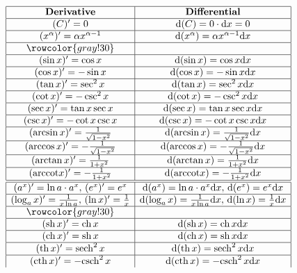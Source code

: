 \documentclass[11pt]{../../TexTemplate/elegantbook}
\begin{document}
\[
\begin{array}{|c|c|}
\hline
\textbf{Derivative} & \textbf{Differential} \\
\hline
(C)'=0 & \mathrm{d}(C)=0\cdot \mathrm{d}x=0 \\
\hline
(x^\alpha)'=\alpha x^{\alpha-1} & \mathrm{d}(x^\alpha)=\alpha x^{\alpha-1}\mathrm{d}x \\ \hline
\rowcolor{gray!30} & \\ \hline
(\sin x)'=\cos x & \mathrm{d}(\sin x)=\cos x\mathrm{d}x \\
\hline
(\cos x)'=-\sin x & \mathrm{d}(\cos x)=-\sin x\mathrm{d}x \\
\hline
(\tan x)'=\sec^2x & \mathrm{d}(\tan x)=\sec^2x\mathrm{d}x \\
\hline
(\cot x)'=-\csc^2x & \mathrm{d}(\cot x)=-\csc^2x\mathrm{d}x \\
\hline
(\sec x)'=\tan x\sec x & \mathrm{d}(\sec x)=\tan x\sec x\mathrm{d}x \\
\hline
(\csc x)'=-\cot x\csc x & \mathrm{d}(\csc x)=-\cot x\csc x\mathrm{d}x \\
\hline
(\arcsin x)'=\frac{1}{\sqrt{1-x^2}} & \mathrm{d}(\arcsin x)=\frac{1}{\sqrt{1-x^2}}\mathrm{d}x \\
\hline
(\arccos x)'=-\frac{1}{\sqrt{1-x^2}} & \mathrm{d}(\arccos x)=-\frac{1}{\sqrt{1-x^2}}\mathrm{d}x \\
\hline
(\arctan x)'=\frac{1}{1+x^2} & \mathrm{d}(\arctan x)=\frac{1}{1+x^2}\mathrm{d}x \\
\hline
(\mathrm{arccot} x)'=-\frac{1}{1+x^2} & \mathrm{d}(\mathrm{arccot} x)=-\frac{1}{1+x^2}\mathrm{d}x \\
\hline
\hline
(a^x)'=\ln a\cdot a^x, \, (e^x)'=e^x & \mathrm{d}(a^x)=\ln a\cdot a^x\mathrm{d}x, \, \mathrm{d}(e^x)=e^x\mathrm{d}x \\
\hline
(\log_{a}x)'=\frac{1}{x\ln a}, \, (\ln x)'=\frac{1}{x} & \mathrm{d}(\log_{a}x)=\frac{1}{x\ln a}\mathrm{d}x, \, \mathrm{d}(\ln x)=\frac{1}{x}\mathrm{d}x \\ \hline
\rowcolor{gray!30} & \\ \hline
(\mathrm{sh}\,x)'=\mathrm{ch}\,x & \mathrm{d}(\mathrm{sh}\,x)=\mathrm{ch}\,x\mathrm{d}x \\
\hline
(\mathrm{ch}\,x)'=\mathrm{sh}\,x & \mathrm{d}(\mathrm{ch}\,x)=\mathrm{sh}\,x\mathrm{d}x \\
\hline
(\mathrm{th}\,x)'=\mathrm{sech}^2\,x & \mathrm{d}(\mathrm{th}\,x)=\mathrm{sech}^2\,x\mathrm{d}x \\
\hline
(\mathrm{cth}\,x)'=-\mathrm{csch}^2\,x & \mathrm{d}(\mathrm{cth}\,x)=-\mathrm{csch}^2\,x\mathrm{d}x \\

\end{array}\]
\end{document}
